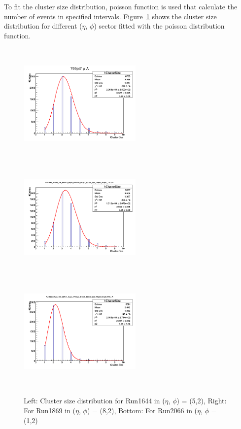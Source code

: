 To fit the cluster size distribution, poisson function is used that calculate the number of events in specified intervals. Figure~\ref{fig:CSDpoissonfunction} shows the cluster size distribution for different ($\eta$, $\phi$) sector fitted with the poisson distribution function.


  \begin{figure}[!htbp]
    \begin{center}

      \includegraphics[width=6cm,height=6cm]{figures/GEM/Run1644.png}
      \includegraphics[width=6cm,height=6cm]{figures/GEM/Run1869.png}
      \includegraphics[width=6cm,height=6cm]{figures/GEM/Run2066.png}
    \end{center}
    \caption{Left: Cluster size distribution for Run1644 in ($\eta$, $\phi$) = (5,2), Right: For Run1869 in ($\eta$, $\phi$) = (8,2), Bottom: For Run2066 in ($\eta$, $\phi$ = (1,2)}
    \label{fig:CSDpoissonfunction}
  \end{figure}

